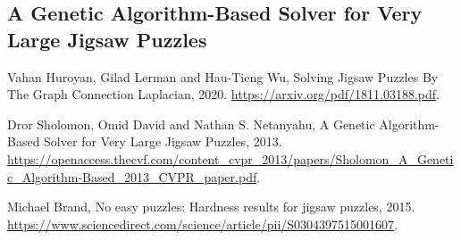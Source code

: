 \documentclass{article}
\begin{document}
\subsection{A Genetic Algorithm-Based Solver for Very Large Jigsaw Puzzles~\cite{GA}}



\newpage
\begin{thebibliography}{9}

    Vahan Huroyan, Gilad   Lerman and Hau-Tieng Wu,
    Solving Jigsaw Puzzles By The Graph Connection Laplacian,
    2020.
    \url{https://arxiv.org/pdf/1811.03188.pdf}.
  
    Dror Sholomon, Omid David and Nathan S. Netanyahu,
    A Genetic Algorithm-Based Solver for Very Large Jigsaw Puzzles,
    2013.
    \url{https://openaccess.thecvf.com/content_cvpr_2013/papers/Sholomon_A_Genetic_Algorithm-Based_2013_CVPR_paper.pdf}.
  
    Michael Brand,
    No easy puzzles: Hardness results for jigsaw puzzles,
    2015.
    \url{https://www.sciencedirect.com/science/article/pii/S0304397515001607}.
  
\end{thebibliography}
\end{document}
